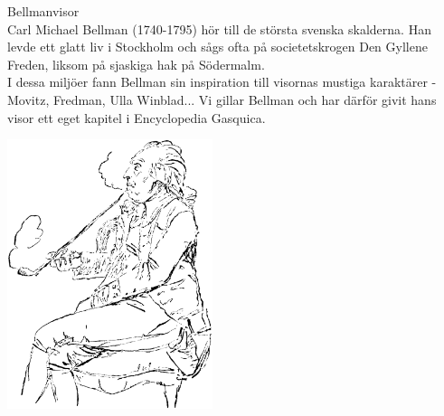 \begin{flushleft}
{\Huge Bellmanvisor\\}
\vspace{1cm}
{\Large Carl Michael Bellman (1740-1795) hör till de största svenska
skalderna. Han levde ett glatt liv i Stockholm och sågs ofta
på societetskrogen Den Gyllene Freden, liksom på sjaskiga hak på
Södermalm.\\
I dessa miljöer fann Bellman sin inspiration till visornas mustiga karaktärer - Movitz, Fredman, Ulla Winblad...
Vi gillar Bellman och har därför givit hans visor ett eget kapitel i Encyclopedia Gasquica.}
\end{flushleft}

\vspace{2cm}
\begin{center}
\includegraphics[width=6cm]{bilder/bellman.png}
\end{center}
\newpage

\newpage
{}
\newpage
{}
\newpage
{}
